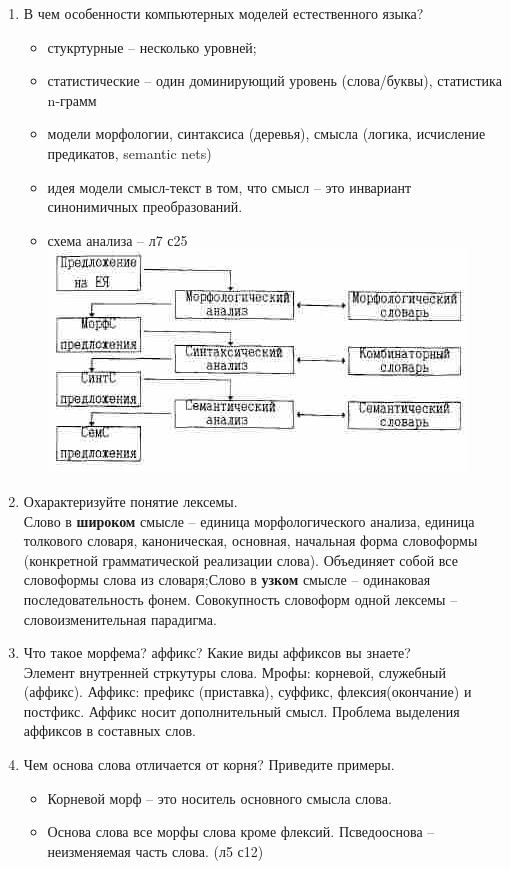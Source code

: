 \documentclass[a4paper]{article}
\begin{document}
\begin{enumerate}
	\item В чем особенности компьютерных моделей естественного языка?\hfill\\ \begin{itemize}
		\item стукртурные -- несколько уровней;
		\item статистические -- один доминирующий уровень (слова/буквы), статистика n-грамм
		\item модели морфологии, синтаксиса (деревья), смысла (логика, исчисление предикатов, semantic nets)
		\item идея модели смысл-текст в том, что смысл -- это инвариант синонимичных преобразований.
		\item схема анализа -- л7 с25\hfill\\
		\includegraphics[scale=0.75]{scheme_l7p25}
	\end{itemize}

	\item Охарактеризуйте понятие лексемы.\hfill\\
	Слово в \textbf{широком} смысле -- единица морфологического анализа, единица толкового словаря, каноническая, основная, начальная форма словоформы (конкретной грамматической реализации слова). Объединяет собой все словоформы слова из словаря;Слово в \textbf{узком} смысле -- одинаковая последовательность фонем. Совокупность словоформ одной лексемы -- словоизменительная парадигма.

	\item Что такое морфема? аффикс? Какие виды аффиксов вы знаете?\hfill\\
	Элемент внутренней стркутуры слова. Мрофы: корневой, служебный (аффикс). Аффикс: префикс (приставка), суффикс, флексия(окончание) и постфикс. Аффикс носит дополнительный смысл. Проблема выделения аффиксов в составных слов.

	\item Чем основа слова отличается от корня? Приведите примеры.\hfill\\ \begin{itemize}
		\item Корневой морф -- это носитель основного смысла слова.
		\item Основа слова все морфы слова кроме флексий. Псведооснова -- неизменяемая часть слова. (л5 с12)
	\end{itemize}


\end{enumerate}
\end{document}
